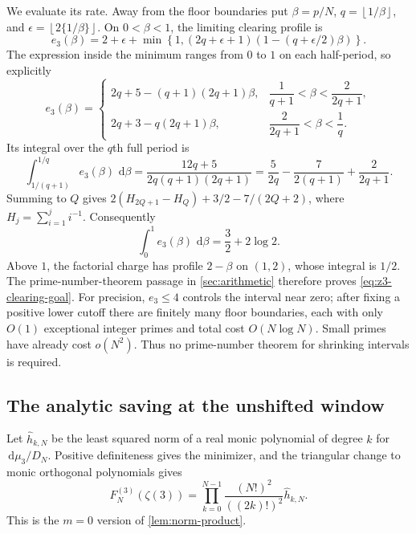 \documentclass[11pt,letterpaper]{article}
\theoremstyle{definition}
\newcommand{\dd}{\,\mathrm d}
\newcommand{\floor}[1]{\left\lfloor #1\right\rfloor}
\begin{document}
We evaluate its rate. Away from the floor boundaries put $\beta=p/N$,
$q=\floor{1/\beta}$, and
$\epsilon=\floor{2\{1/\beta\}}$. On $0<\beta<1$, the limiting
clearing profile is
\[
 e_3(\beta)=2+\epsilon+
 \min\left\{1,
 (2q+\epsilon+1)\left(1-(q+\epsilon/2)\beta\right)\right\}.
\]
The expression inside the minimum ranges from $0$ to $1$ on each
half-period, so explicitly
\begin{equation}\label{eq:z3-arithmetic-profile}
 e_3(\beta)=
 \begin{cases}
 2q+5-(q+1)(2q+1)\beta,
   &\dfrac1{q+1}<\beta<\dfrac2{2q+1},\\[2mm]
 2q+3-q(2q+1)\beta,
   &\dfrac2{2q+1}<\beta<\dfrac1q.
 \end{cases}
\end{equation}
Its integral over the $q$th full period is
\[
 \int_{1/(q+1)}^{1/q}e_3(\beta)\,\dd\beta
 =\frac{12q+5}{2q(q+1)(2q+1)}
 =\frac5{2q}-\frac7{2(q+1)}+\frac2{2q+1}.
\]
Summing to $Q$ gives
$2(H_{2Q+1}-H_Q)+3/2-7/(2Q+2)$, where
$H_j=\sum_{i=1}^j i^{-1}$. Consequently
\[
 \int_0^1e_3(\beta)\,\dd\beta=\frac32+2\log2.
\]
Above $1$, the factorial charge has profile $2-\beta$ on $(1,2)$,
whose integral is $1/2$. The prime-number-theorem passage in
\cref{sec:arithmetic} therefore proves \eqref{eq:z3-clearing-goal}.
For precision, $e_3\le4$ controls the interval near zero; after fixing
a positive lower cutoff there are finitely many floor boundaries, each
with only $O(1)$ exceptional integer primes and total cost
$O(N\log N)$. Small primes have already cost $o(N^2)$. Thus no
prime-number theorem for shrinking intervals is required.

\subsection{The analytic saving at the unshifted window}

Let $\widehat h_{k,N}$ be the least squared norm of a real monic
polynomial of degree $k$ for $\dd\mu_3/D_N$. Positive definiteness
gives the minimizer, and the triangular change to monic orthogonal
polynomials gives
\begin{equation}\label{eq:z3-norm-product}
 F_N^{(3)}(\zeta(3))
 =\prod_{k=0}^{N-1}\frac{(N!)^2}{((2k)!)^2}\widehat h_{k,N}.
\end{equation}
This is the $m=0$ version of \cref{lem:norm-product}.
\end{document}
